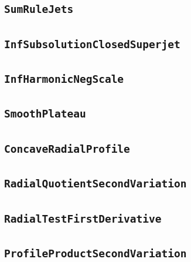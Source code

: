 \documentclass[11pt]{amsart}
\theoremstyle{definition}
\begin{document}
\subsection{\texorpdfstring{\texttt{SumRuleJets}}{SumRuleJets}}\label{node:SumRuleJets}


\subsection{\texorpdfstring{\texttt{InfSubsolutionClosedSuperjet}}{InfSubsolutionClosedSuperjet}}\label{node:InfSubsolutionClosedSuperjet}


\subsection{\texorpdfstring{\texttt{InfHarmonicNegScale}}{InfHarmonicNegScale}}\label{node:InfHarmonicNegScale}


\subsection{\texorpdfstring{\texttt{SmoothPlateau}}{SmoothPlateau}}\label{node:SmoothPlateau}


\subsection{\texorpdfstring{\texttt{ConcaveRadialProfile}}{ConcaveRadialProfile}}\label{node:ConcaveRadialProfile}


\subsection{\texorpdfstring{\texttt{RadialQuotientSecondVariation}}{RadialQuotientSecondVariation}}\label{node:RadialQuotientSecondVariation}


\subsection{\texorpdfstring{\texttt{RadialTestFirstDerivative}}{RadialTestFirstDerivative}}\label{node:RadialTestFirstDerivative}


\subsection{\texorpdfstring{\texttt{ProfileProductSecondVariation}}{ProfileProductSecondVariation}}\label{node:ProfileProductSecondVariation}

\end{document}
